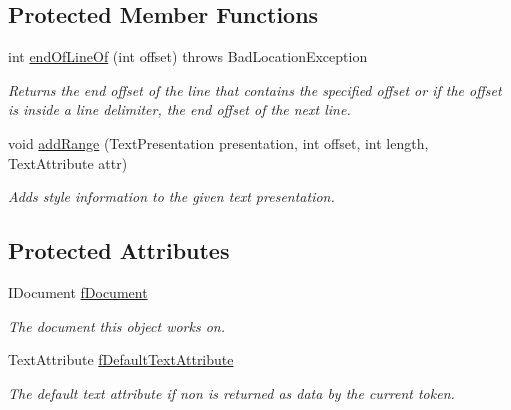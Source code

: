\subsection*{Protected Member Functions}
\begin{DoxyCompactItemize}
\item 
int \hyperlink{classcom_1_1fware_1_1cspdt_1_1cspm_1_1editor_1_1config_1_1_non_rule_based_damager_repairer_a3e3084dfd0d0995dee91f6a2c23ee43e}{end\+Of\+Line\+Of} (int offset)  throws Bad\+Location\+Exception 
\begin{DoxyCompactList}\small\item\em Returns the end offset of the line that contains the specified offset or if the offset is inside a line delimiter, the end offset of the next line. \end{DoxyCompactList}\item 
void \hyperlink{classcom_1_1fware_1_1cspdt_1_1cspm_1_1editor_1_1config_1_1_non_rule_based_damager_repairer_a0fed10472da4fc71c06b37826c25b247}{add\+Range} (Text\+Presentation presentation, int offset, int length, Text\+Attribute attr)
\begin{DoxyCompactList}\small\item\em Adds style information to the given text presentation. \end{DoxyCompactList}\end{DoxyCompactItemize}
\subsection*{Protected Attributes}
\begin{DoxyCompactItemize}
\item 
\mbox{\label{classcom_1_1fware_1_1cspdt_1_1cspm_1_1editor_1_1config_1_1_non_rule_based_damager_repairer_a295dc05aa1d1c74b90f2b23ebd345c59}} 
I\+Document \hyperlink{classcom_1_1fware_1_1cspdt_1_1cspm_1_1editor_1_1config_1_1_non_rule_based_damager_repairer_a295dc05aa1d1c74b90f2b23ebd345c59}{f\+Document}
\begin{DoxyCompactList}\small\item\em The document this object works on. \end{DoxyCompactList}\item 
\mbox{\label{classcom_1_1fware_1_1cspdt_1_1cspm_1_1editor_1_1config_1_1_non_rule_based_damager_repairer_a259b7a776b8451c81d1ad57f536056c4}} 
Text\+Attribute \hyperlink{classcom_1_1fware_1_1cspdt_1_1cspm_1_1editor_1_1config_1_1_non_rule_based_damager_repairer_a259b7a776b8451c81d1ad57f536056c4}{f\+Default\+Text\+Attribute}
\begin{DoxyCompactList}\small\item\em The default text attribute if non is returned as data by the current token. \end{DoxyCompactList}\end{DoxyCompactItemize}


